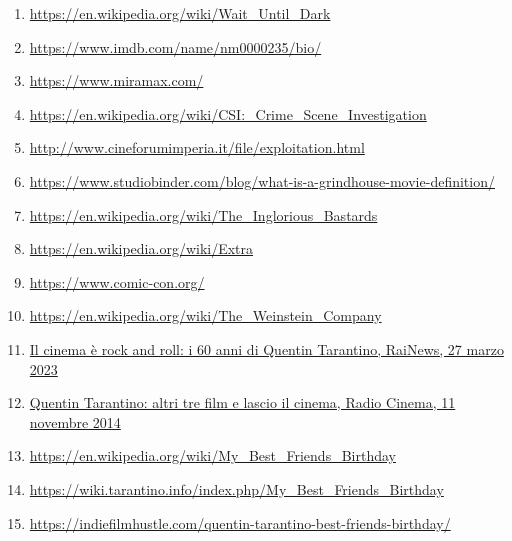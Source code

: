 \documentclass[12pt]{article} %
\begin{document}
\begin{flushleft}
\begin{enumerate}
        \item \href{https://en.wikipedia.org/wiki/Wait_Until_Dark}{https://en.wikipedia.org/wiki/Wait\_Until\_Dark}
        \item \href{https://www.imdb.com/name/nm0000235/bio/}{https://www.imdb.com/name/nm0000235/bio/}
        \item \href{https://www.miramax.com/}{https://www.miramax.com/}
        \item \href{https://en.wikipedia.org/wiki/CSI:_Crime_Scene_Investigation}{https://en.wikipedia.org/wiki/CSI:\_Crime\_Scene\_Investigation}
        \item \href{http://www.cineforumimperia.it/file/cine_RUBRICHE/rub_approfondimenti/uno_sguardo/sg_exploitation.html}{http://www.cineforumimperia.it/file/exploitation.html}
        \item \href{https://www.studiobinder.com/blog/what-is-a-grindhouse-movie-definition/}{https://www.studiobinder.com/blog/what-is-a-grindhouse-movie-definition/}
        \item \href{https://en.wikipedia.org/wiki/The_Inglorious_Bastards}{https://en.wikipedia.org/wiki/The\_Inglorious\_Bastards}
        \item \href{https://en.wikipedia.org/wiki/Extra_(American_TV_program)}{https://en.wikipedia.org/wiki/Extra}
        \item \href{https://www.comic-con.org/}{https://www.comic-con.org/}
        \item \href{https://en.wikipedia.org/wiki/The_Weinstein_Company}{https://en.wikipedia.org/wiki/The\_Weinstein\_Company}
        \item \href{https://www.rainews.it/photogallery/2023/03/il-cinema--rock-and-roll-i-60-anni-di-quentin-tarantino-35b729db-7cc9-4b1b-a3cf-235bc05a55e6.html}{Il cinema è rock and roll: i 60 anni di Quentin Tarantino, RaiNews, 27 marzo 2023}
        \item \href{https://www.radiocinema.it/news/quentin-tarantino-altri-tre-film-lascio-il-cinema}{Quentin Tarantino: altri tre film e lascio il cinema, Radio Cinema, 11 novembre 2014}
        \item \href{https://en.wikipedia.org/wiki/My_Best_Friend%27s_Birthday}{https://en.wikipedia.org/wiki/My\_Best\_Friends\_Birthday}
        \item \href{https://wiki.tarantino.info/index.php/My_Best_Friend%27s_Birthday}{https://wiki.tarantino.info/index.php/My\_Best\_Friends\_Birthday}
        \item \href{https://indiefilmhustle.com/quentin-tarantino-best-friends-birthday/}{https://indiefilmhustle.com/quentin-tarantino-best-friends-birthday/}

\end{enumerate}
\end{flushleft}
\end{document}

